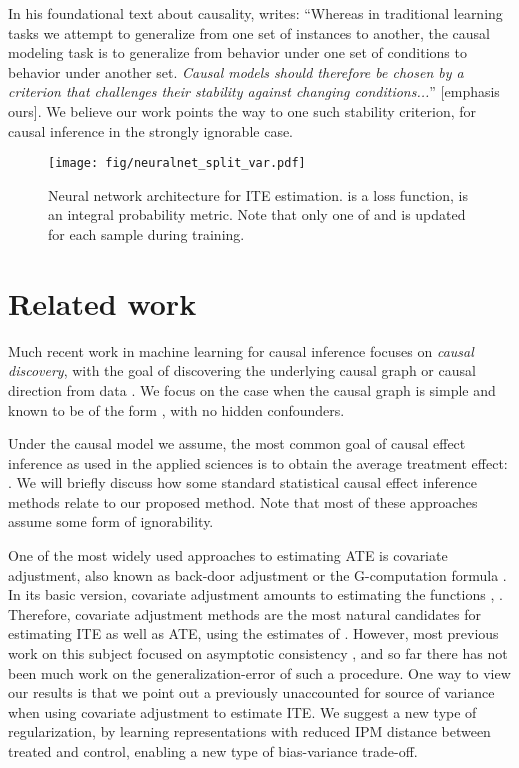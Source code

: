 \documentclass{article}
\begin{document}
In his foundational text about causality, \citet{pearl2009causality} writes: ``Whereas in traditional learning tasks we attempt to generalize from one set of instances to another, the causal modeling task is to generalize from behavior under one set of conditions to behavior under another set. \emph{Causal models should therefore be chosen by a criterion that challenges their stability against changing conditions...}'' [emphasis ours]. We believe our work points the way to one such stability criterion, for causal inference in the strongly ignorable case.




\begin{figure}[t!]
  \centering
  \texttt{[image: fig/neuralnet\_split\_var.pdf]}
  \caption{\label{fig:neuralnet}Neural network architecture for ITE estimation.  is a loss function,  is an integral probability metric. Note that only one of  and  is updated for each sample during training. }
\end{figure}

\section{Related work}

Much recent work in machine learning for causal inference focuses on \emph{causal discovery}, with the goal of discovering the underlying causal graph or causal direction from data \citep{hoyer2009nonlinear,maathuis2010predicting,triantafillou2015constraint,mooij2016distinguishing}. We focus on the case when the causal graph is simple and known to be of the form , with no hidden confounders.

Under the causal model we assume, the most common goal of causal effect inference as used in the applied sciences is to obtain the average treatment effect: . We will briefly discuss how some standard statistical causal effect inference methods relate to our proposed method. Note that most of these approaches assume some form of ignorability.

One of the most widely used approaches to estimating ATE is covariate adjustment, also known as back-door adjustment or the G-computation formula \citep{pearl2009causality,rubin2011causal}. In its basic version, covariate adjustment amounts to estimating the functions , . Therefore, covariate adjustment methods are the most natural candidates for estimating ITE as well as ATE, using the estimates of . However, most previous work on this subject focused on asymptotic consistency \citep{belloni2014inference,athey2016efficient,chernozhukov2016double}, and so far there has not been much work on the generalization-error of such a procedure. One way to view our results is that we point out a previously unaccounted for source of variance when using covariate adjustment to estimate ITE. We suggest a new type of regularization, by learning representations with reduced IPM distance between treated and control, enabling a new type of bias-variance trade-off.
\end{document}

